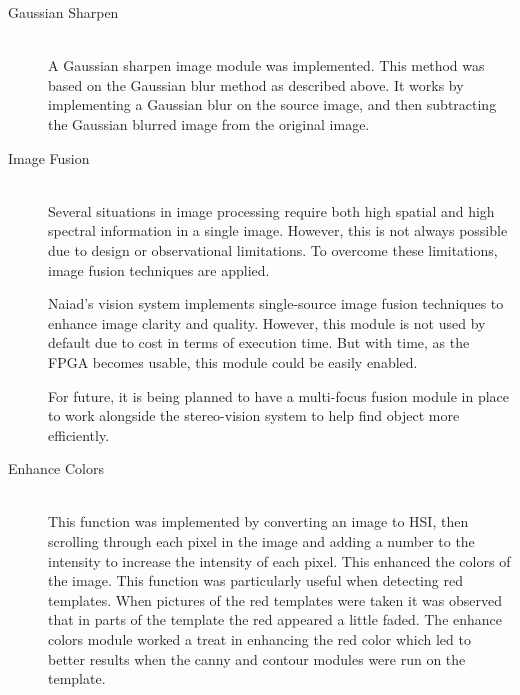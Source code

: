\begin{description}
\item[Gaussian Sharpen]\hfill \\
A Gaussian sharpen image module was implemented. This method was based on the Gaussian blur method as described above. It works by implementing a Gaussian blur on the source image, and then subtracting the Gaussian blurred image from the original image. 

\item[Image Fusion]\hfill \\
Several situations in image processing require both high spatial and high spectral information in a single image. However, this is not always possible due to design or observational limitations.
To overcome these limitations, image fusion techniques are applied.

Naiad's vision system implements single-source image fusion techniques to enhance image clarity and quality. However, this module is not used by default due to cost in terms of execution time. But with time, as the FPGA becomes usable, this module could be easily enabled.

For future, it is being planned to have a multi-focus fusion module in place to work alongside the stereo-vision system to help find object more efficiently. 
\cite{article:Zheng2010} \cite{article:Zhang2010} \cite{article:Shutao}

\item[Enhance Colors]\hfill \\
This function was implemented by converting an image to HSI, then scrolling through each pixel in the image and adding a number to the intensity to increase the intensity of each pixel. This enhanced the colors of the image. This function was particularly useful when detecting red templates. When pictures of the red templates were taken it was observed that in parts of the template the red appeared a little faded. The enhance colors module worked a treat in enhancing the red color which led to better results when the canny and contour modules were run on the template. 
\end{description}


